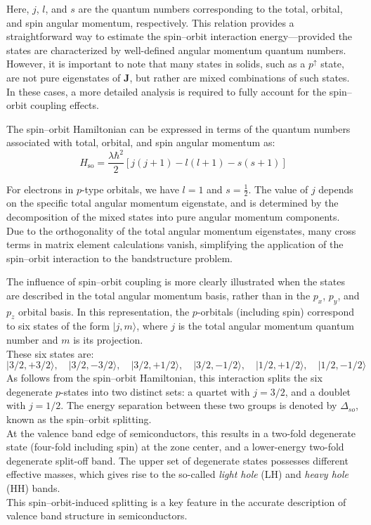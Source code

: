 \noindent
Here, \( j \), \( l \), and \( s \) are the quantum numbers corresponding to the total, orbital, and spin angular momentum, respectively. This relation provides a straightforward way to estimate the spin–orbit interaction energy—provided the states are characterized by well-defined angular momentum quantum numbers.\\
However, it is important to note that many states in solids, such as a \( p^\uparrow \) state, are not pure eigenstates of \( \mathbf{J} \), but rather are mixed combinations of such states. In these cases, a more detailed analysis is required to fully account for the spin–orbit coupling effects.

The spin–orbit Hamiltonian can be expressed in terms of the quantum numbers associated with total, orbital, and spin angular momentum as:
\begin{equation}
	H_{\text{so}} = \frac{\lambda \hbar^2}{2} \left[ j(j + 1) - l(l + 1) - s(s + 1) \right]
\end{equation}

\noindent
For electrons in \( p \)-type orbitals, we have \( l = 1 \) and \( s = \frac{1}{2} \). The value of \( j \) depends on the specific total angular momentum eigenstate, and is determined by the decomposition of the mixed states into pure angular momentum components.\\
Due to the orthogonality of the total angular momentum eigenstates, many cross terms in matrix element calculations vanish, simplifying the application of the spin–orbit interaction to the bandstructure problem.

The influence of spin–orbit coupling is more clearly illustrated when the states are described in the total angular momentum basis, rather than in the \( p_x \), \( p_y \), and \( p_z \) orbital basis. In this representation, the \( p \)-orbitals (including spin) correspond to six states of the form \( |j, m\rangle \), where \( j \) is the total angular momentum quantum number and \( m \) is its projection.\\
These six states are:
\begin{equation*}
	|3/2, +3/2\rangle, \quad |3/2, -3/2\rangle, \quad |3/2, +1/2\rangle, \quad |3/2, -1/2\rangle, \quad |1/2, +1/2\rangle, \quad |1/2, -1/2\rangle
\end{equation*}
As follows from the spin–orbit Hamiltonian, this interaction splits the six degenerate \( p \)-states into two distinct sets: a quartet with \( j = 3/2 \), and a doublet with \( j = 1/2 \). The energy separation between these two groups is denoted by \( \Delta_{so} \), known as the spin–orbit splitting.\\
At the valence band edge of semiconductors, this results in a two-fold degenerate state (four-fold including spin) at the zone center, and a lower-energy two-fold degenerate split-off band. The upper set of degenerate states possesses different effective masses, which gives rise to the so-called \textit{light hole} (LH) and \textit{heavy hole} (HH) bands.\\
This spin–orbit-induced splitting is a key feature in the accurate description of valence band structure in semiconductors.

